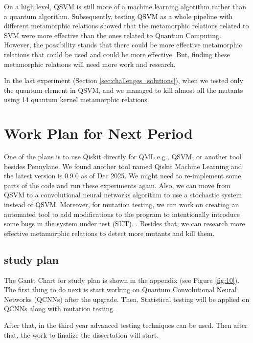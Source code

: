 \documentclass[12pt,a4paper]{article}
\begin{document}
	On a high level, QSVM is still more of a machine learning algorithm rather than a quantum algorithm. Subsequently, testing QSVM as a whole pipeline with different metamorphic relations showed that the metamorphic relations related to SVM were more effective than the ones related to Quantum Computing. However, the possibility stands that there could be more effective metamorphic relations that could be used and could be more effective. But, finding these metamorphic relations will need more work and research. 
	
	In the last experiment (Section \ref{sec:challenges_solutions}), when we tested only the quantum element in QSVM, and we managed to kill almost all the mutants using 14 quantum kernel metamorphic relations.
	
	\section{Work Plan for Next Period}
	\label{sec:next-plan}
	
	One of the plans is to use Qiskit directly for QML e.g., QSVM, or another tool besides Pennylane. We found another tool named Qiskit Machine Learning and the latest version is 0.9.0 as of Dec 2025. We might need to re-implement some parts of the code and run these experiments again.  Also, we can move from QSVM to a convolutional neural networks algorithm to use a stochastic system instead of QSVM. Moreover, for mutation testing, we can work on creating an automated tool to add modifications to the program to intentionally introduce some bugs in the system under test (SUT). \cite{qMutphyFortunato}. Besides that, we can research more effective metamorphic relations to detect more mutants and kill them.  
	
	\subsection{study plan}
	
	The Gantt Chart for study plan is shown in the appendix (see Figure \ref{fig:10}). The first thing to do next is start working on Quantum Convolutional Neural Networks (QCNNs) after the upgrade. Then, Statistical testing will be applied on QCNNs along with mutation testing. 
	
	After that, in the third year advanced testing techniques can be used. Then after that, the work to finalize the dissertation will start.
	

	
\end{document}
